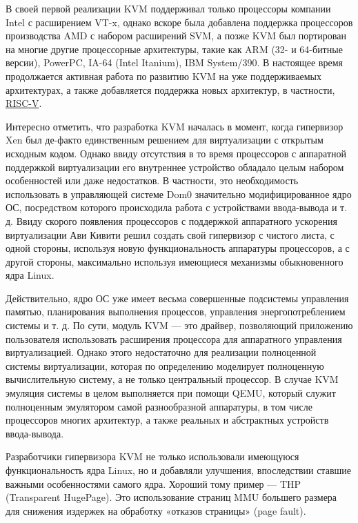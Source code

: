 \documentclass[14pt, a4paper]{article}
\begin{document}
В своей первой реализации KVM поддерживал только процессоры компании Intel с расширением
VT-x, однако вскоре была добавлена поддержка процессоров производства AMD с набором
расширений SVM, а позже KVM был портирован на многие другие процессорные архитектуры, такие
как ARM (32- и 64-битные версии), PowerPC, IA-64 (Intel Itanium), IBM System/390. В настоящее время
продолжается активная работа по развитию KVM на уже поддерживаемых архитектурах, а также
добавляется поддержка новых архитектур, в частности, \href{https://lwn.net/Articles/797797/}{RISC-V}.

Интересно отметить, что разработка KVM началась в момент, когда гипервизор Xen был де-факто
единственным решением для виртуализации с открытым исходным кодом. Однако ввиду отсутствия в
то время процессоров с аппаратной поддержкой виртуализации его внутреннее устройство обладало
целым набором особенностей или даже недостатков. В частности, это необходимость использовать в
управляющей системе Dom0 значительно модифицированное ядро ОС, посредством которого
происходила работа с устройствами ввода-вывода и т. д. Ввиду скорого появления процессоров с
поддержкой аппаратного ускорения виртуализации Ави Кивити решил создать свой гипервизор с
чистого листа, с одной стороны, используя новую функциональность аппаратуры процессоров, а с
другой стороны, максимально используя имеющиеся механизмы обыкновенного ядра Linux.

Действительно, ядро ОС уже имеет весьма совершенные подсистемы управления памятью,
планирования выполнения процессов, управления энергопотреблением системы и т. д. По сути,
модуль KVM — это драйвер, позволяющий приложению пользователя использовать расширения
процессора для аппаратного управления виртуализацией. Однако этого недостаточно для реализации
полноценной системы виртуализации, которая по определению моделирует полноценную
вычислительную систему, а не только центральный процессор. В случае KVM эмуляция системы в
целом выполняется при помощи QEMU, который служит полноценным эмулятором самой
разнообразной аппаратуры, в том числе процессоров многих архитектур, а также реальных и
абстрактных устройств ввода-вывода.

Разработчики гипервизора KVM не только использовали имеющуюся функциональность ядра Linux,
но и добавляли улучшения, впоследствии ставшие важными особенностями самого ядра. Хороший
тому пример — THP (Transparent HugePage). Это использование страниц MMU большего размера для
снижения издержек на обработку «отказов страницы» (page fault).\\
\end{document}
